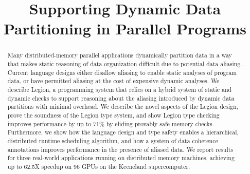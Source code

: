 \documentclass[9pt,nocopyrightspace,preprint]{sigplanconf}
\begin{document}
\title{Supporting Dynamic Data Partitioning in Parallel Programs}
\maketitle

\begin{abstract}
Many distributed-memory parallel applications dynamically partition 
data in a way that makes static reasoning of data organization difficult 
due to potential data aliasing. Current language designs either 
disallow aliasing to enable static analyses of program data, 
or have permitted aliasing at the cost of expensive dynamic analyses.
We describe Legion, a programming system that relies on a hybrid system
of static and dynamic checks to support reasoning about the aliasing introduced
by dynamic data partitions with minimal overhead.  We describe the novel aspects of the Legion design, 
prove the soundness of the Legion type system, and show Legion type checking 
improves performance by up to 71\% by eliding provably safe memory checks.  
Furthermore, we show how the language design and type safety
enables a hierarchical, distributed runtime scheduling algorithm, and how
a system of data coherence annotations improves performance in the presence
of aliased data.  We report results for three real-world applications running
on distributed memory machines, achieving up to 62.5X speedup on 96 GPUs 
on the Keeneland supercomputer.



\end{abstract}
\end{document}
